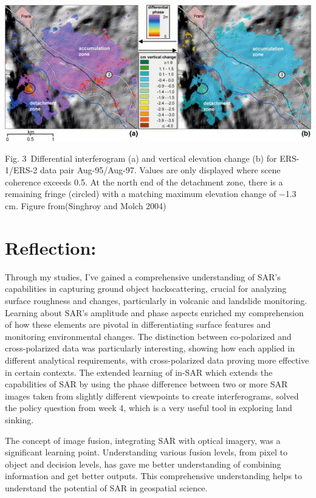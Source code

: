\documentclass[
  letterpaper,
  DIV=11,
  numbers=noendperiod]{scrreprt}
\begin{document}
\includegraphics{in-SAR.png}

Fig. 3~Differential interferogram (a) and vertical elevation change (b)
for ERS-1/ERS-2 data pair Aug-95/Aug-97. Values are only displayed where
scene coherence exceeds 0.5. At the north end of the detachment zone,
there is a remaining fringe (circled) with a matching maximum elevation
change of −1.3 cm. Figure from(Singhroy and Molch 2004)

\section{Reflection:}\label{reflection-5}

Through my studies, I've gained a comprehensive understanding of SAR's
capabilities in capturing ground object backscattering, crucial for
analyzing surface roughness and changes, particularly in volcanic and
landslide monitoring. Learning about SAR's amplitude and phase aspects
enriched my comprehension of how these elements are pivotal in
differentiating surface features and monitoring environmental changes.
The distinction between co-polarized and cross-polarized data was
particularly interesting, showing how each applied in different
analytical requirements, with cross-polarized data proving more
effective in certain contexts. The extended learning of in-SAR which
extends the capabilities of SAR by using the phase difference between
two or more SAR images taken from slightly different viewpoints to
create interferograms, solved the policy question from week 4, which is
a very useful tool in exploring land sinking.

The concept of image fusion, integrating SAR with optical imagery, was a
significant learning point. Understanding various fusion levels, from
pixel to object and decision levels, has gave me better understanding of
combining information and get better outputs. This comprehensive
understanding helps to understand the potential of SAR in geospatial
science.
\end{document}
